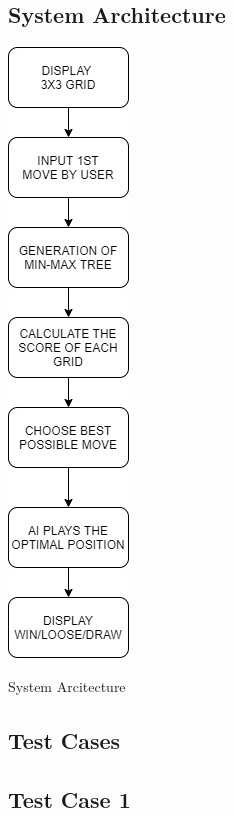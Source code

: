 \documentclass[a4paper, 12pt]{article}
\begin{document}
\newpage
\begin{center}
    \section{System Architecture}
\end{center}
    \par
        \centering
        \includegraphics{SA.jpeg}
        \caption{System Arcitecture}

\newpage
\begin{center}
\section{Test Cases}
\end{center}
\subsection{Test Case 1}
         
\end{document}
